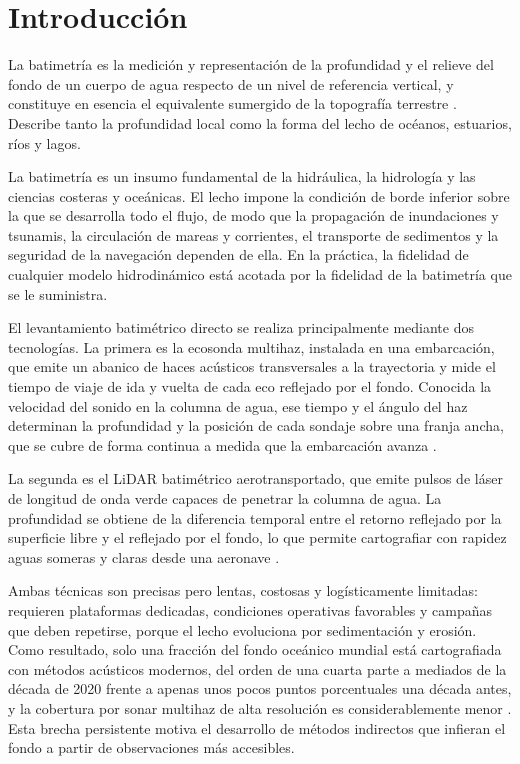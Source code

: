 \section{Introducción}
\label{sec:intro}

La batimetría es la medición y representación de la profundidad y el relieve
del fondo de un cuerpo de agua respecto de un nivel de referencia vertical, y
constituye en esencia el equivalente sumergido de la topografía terrestre
\cite{wolfl2019, talley2011}. Describe tanto la profundidad local como la
forma del lecho de océanos, estuarios, ríos y lagos.

La batimetría es un insumo fundamental de la hidráulica, la hidrología y las
ciencias costeras y oceánicas. El lecho impone la condición de borde inferior
sobre la que se desarrolla todo el flujo, de modo que la propagación de
inundaciones y tsunamis, la circulación de mareas y corrientes, el transporte
de sedimentos y la seguridad de la navegación dependen de ella. En la práctica,
la fidelidad de cualquier modelo hidrodinámico está acotada por la fidelidad de
la batimetría que se le suministra.

El levantamiento batimétrico directo se realiza principalmente mediante dos
tecnologías. La primera es la ecosonda multihaz, instalada en una embarcación,
que emite un abanico de haces acústicos transversales a la trayectoria y mide
el tiempo de viaje de ida y vuelta de cada eco reflejado por el fondo. Conocida
la velocidad del sonido en la columna de agua, ese tiempo y el ángulo del haz
determinan la profundidad y la posición de cada sondaje sobre una franja ancha,
que se cubre de forma continua a medida que la embarcación avanza
\cite{lurton2010}.

La segunda es el LiDAR batimétrico aerotransportado, que emite pulsos de láser
de longitud de onda verde capaces de penetrar la columna de agua. La
profundidad se obtiene de la diferencia temporal entre el retorno reflejado por
la superficie libre y el reflejado por el fondo, lo que permite cartografiar con
rapidez aguas someras y claras desde una aeronave \cite{guenther2000,
szafarczyk2023}.

Ambas técnicas son precisas pero lentas, costosas y logísticamente limitadas:
requieren plataformas dedicadas, condiciones operativas favorables y campañas
que deben repetirse, porque el lecho evoluciona por sedimentación y erosión.
Como resultado, solo una fracción del fondo oceánico mundial está cartografiada
con métodos acústicos modernos, del orden de una cuarta parte a mediados de la
década de 2020 frente a apenas unos pocos puntos porcentuales una década antes,
y la cobertura por sonar multihaz de alta resolución es considerablemente menor
\cite{wolfl2019}. Esta brecha persistente motiva el desarrollo de métodos
indirectos que infieran el fondo a partir de observaciones más accesibles.

